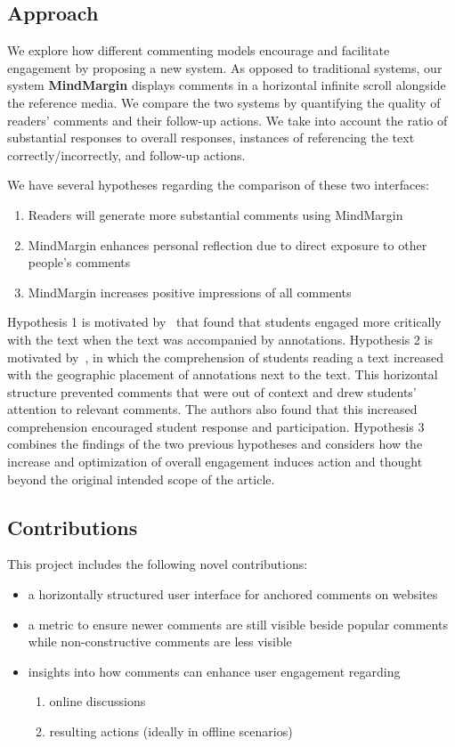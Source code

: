 \subsection{Approach}

We explore how different commenting models encourage and facilitate engagement by proposing a new system. As opposed to traditional systems, our system \textbf{MindMargin} displays comments in a horizontal infinite scroll alongside the reference media. We compare the two systems by quantifying the quality of readers' comments and their follow-up actions. We take into account the ratio of substantial responses to overall responses, instances of referencing the text correctly/incorrectly, and follow-up actions.

We have several hypotheses regarding the comparison of these two interfaces:
\begin{enumerate}
\item Readers will generate more substantial comments using MindMargin
\item MindMargin enhances personal reflection due to direct exposure to other people's comments
\item MindMargin increases positive impressions of all comments
\end{enumerate}

Hypothesis 1 is motivated by~\cite{AnnotationsStudents} that found that students engaged more critically with the text when the text was accompanied by annotations. 
Hypothesis 2 is motivated by~\cite{NB}, in which the comprehension of students reading a text increased with the geographic placement of annotations next to the text. This horizontal structure prevented comments that were out of context and drew students' attention to relevant comments. The authors also found that this increased comprehension encouraged student response and participation.
Hypothesis 3 combines the findings of the two previous hypotheses and considers how the increase and optimization of overall engagement induces action and thought beyond the original intended scope of the article. 

\subsection{Contributions}

This project includes the following novel contributions:

\begin{itemize}
\item a horizontally structured user interface for anchored comments on websites
\item a metric to ensure newer comments are still visible beside popular comments while non-constructive comments are less visible
\item insights into how comments can enhance user engagement regarding
\begin{enumerate}
\item online discussions
\item resulting actions (ideally in offline scenarios)
\end{enumerate}

\end{itemize}